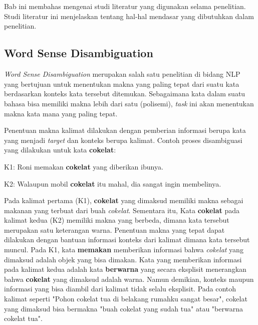 \chapter{\babDua}
Bab ini membahas mengenai studi literatur yang digunakan selama penelitian. Studi literatur ini menjelaskan tentang hal-hal mendasar yang dibutuhkan dalam penelitian.

\section{Word Sense Disambiguation}
\textit{Word Sense Disambiguation} merupakan salah satu penelitian di bidang NLP yang bertujuan untuk menentukan makna yang paling tepat dari suatu kata berdasarkan konteks kata tersebut ditemukan. Sebagaimana kata dalam suatu bahasa bisa memiliki makna lebih dari satu (polisemi), \textit{task} ini akan menentukan makna kata mana yang paling tepat. 

Penentuan makna kalimat dilakukan dengan pemberian informasi berupa kata yang menjadi \textit{target} dan konteks berupa kalimat. Contoh proses disambiguasi yang dilakukan untuk kata \textbf{cokelat}:



K1: Roni memakan \textbf{cokelat} yang diberikan ibunya.


K2: Walaupun mobil \textbf{cokelat} itu mahal, dia sangat ingin membelinya.



Pada kalimat pertama (K1), \textbf{cokelat} yang dimaksud memiliki makna sebagai makanan yang terbuat dari buah \textit{cokelat}. Sementara itu, Kata \textbf{cokelat} pada kalimat kedua (K2) memiliki makna yang berbeda, dimana kata tersebut merupakan satu keterangan warna. Penentuan makna yang tepat dapat dilakukan dengan bantuan informasi konteks dari kalimat dimana kata tersebut muncul. Pada K1, kata \textbf{memakan} memberikan informasi bahwa \textit{cokelat} yang dimaksud adalah objek yang bisa dimakan. Kata yang memberikan informasi pada kalimat kedua adalah kata \textbf{berwarna} yang secara eksplisit menerangkan bahwa \textbf{cokelat} yang dimaksud adalah warna. Namun demikian, konteks maupun informasi yang bisa diambil dari kalimat tidak selalu eksplisit. Pada contoh kalimat seperti "Pohon cokelat tua di belakang rumahku sangat besar", cokelat yang dimaksud bisa bermakna "buah cokelat yang sudah tua" atau "berwarna cokelat tua".

